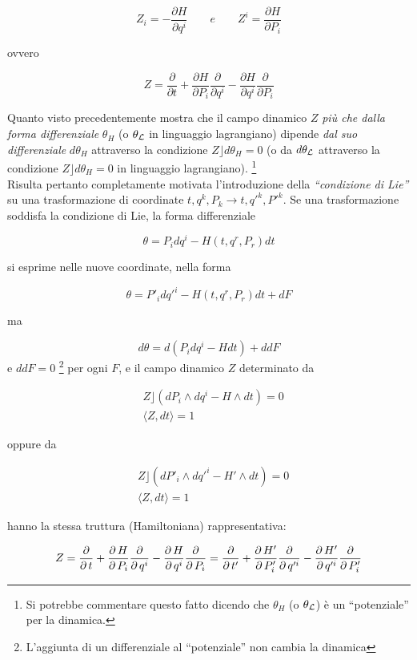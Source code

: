 \begin{equation*}
Z_i = - \frac{\partial H}{\partial q^i} \qquad e \qquad Z^i = \frac{\partial H}{\partial P_i}
\end{equation*}

ovvero

\begin{equation*}
Z = \frac{\partial}{\partial  t} + \frac{\partial H}{\partial P_i}\frac{\partial}{\partial q^i} - \frac{\partial H}{\partial q^i}\frac{\partial}{\partial P_i}
\end{equation*}


Quanto visto precedentemente mostra che il campo dinamico $ Z $ \textit{più che dalla forma differenziale} $ \theta_H $ (o $ \theta_{\operatorname{\mathcal{L}}} $ in linguaggio lagrangiano) dipende \textit{dal suo differenziale} $ d \theta_H $ attraverso la condizione $ Z \rfloor d\theta_H = 0 $ (o da $ d\theta_{\operatorname{\mathcal{L}}} $ attraverso la condizione $ Z \rfloor d\theta_H = 0 $ in linguaggio lagrangiano). \footnote{Si potrebbe commentare questo fatto dicendo che $ \theta_H $ (o $ \theta_{\operatorname{\mathcal{L}}} $) è un ``potenziale'' per la dinamica.} \\
Risulta pertanto completamente motivata l'introduzione della \textit{``condizione di Lie''} su una trasformazione di coordinate $ t, q^k, P_k \rightarrow t, q'^k, P'^k $. Se una trasformazione soddisfa la condizione di Lie, la forma differenziale

\begin{equation*}
\theta = P_i dq^i - H (t, q^r, P_r) dt
\end{equation*}

si esprime nelle nuove coordinate, nella forma

\begin{equation*}
\theta = P'_i dq'^i - H (t, q^r, P_r) dt + dF
\end{equation*}

ma

\begin{equation*}
d\theta = d (P_i dq^i - H dt) + ddF
\end{equation*}
e $ddF=0$ \footnote{L'aggiunta di un differenziale al ``potenziale'' non cambia la dinamica} per ogni $ F $, e il campo dinamico $ Z $ determinato da

\begin{align*}
&Z \rfloor (dP_i \wedge dq^i - H \wedge dt) = 0
\\&\langle Z,dt\rangle = 1
\end{align*}

oppure da

\begin{align*}
&Z \rfloor (dP'_i \wedge dq'^i - H' \wedge dt) = 0
\\ &\langle Z,dt\rangle = 1
\end{align*}

hanno la stessa truttura (Hamiltoniana) rappresentativa:

\begin{equation*}
Z= \frac{\operatorname{\partial}}{\operatorname{\partial} t}+\frac{\operatorname{\partial} H}{\operatorname{\partial} P_i} \frac{\operatorname{\partial}}{\operatorname{\partial} q^i}- \frac{\operatorname{\partial} H}{\operatorname{\partial} q^i} \frac{\operatorname{\partial}}{\operatorname{\partial} P_i} = \frac{\operatorname{\partial}}{\operatorname{\partial} t'} + \frac{\operatorname{\partial} H'}{\operatorname{\partial} P'_i} \frac{\operatorname{\partial}}{\operatorname{\partial} q'^i} - \frac{\operatorname{\partial} H'}{\operatorname{\partial} q'^i} \frac{\operatorname{\partial}}{\operatorname{\partial} P'_i}
\end{equation*}